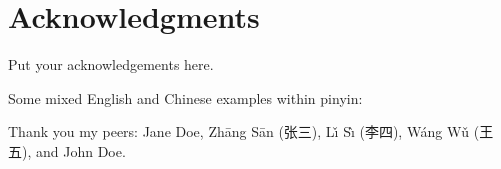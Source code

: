 \chapter*{Acknowledgments}

Put your acknowledgements here.

Some mixed English and Chinese examples within pinyin: 

Thank you my peers: Jane Doe, Zh\=ang S\=an (张三), L\v{\i} S\`{\i} (李四), W\'ang W\v{u} (王五), and John Doe.